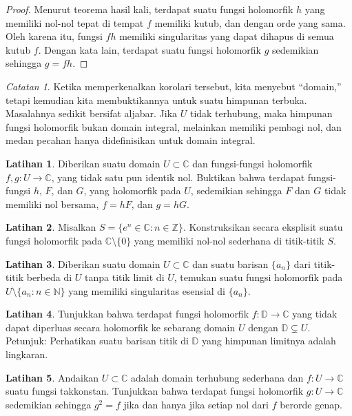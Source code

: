 \documentclass[12pt,openany]{book}
\newcommand{\C}{{\mathbb{C}}}
\newcommand{\Z}{{\mathbb{Z}}}
\newcommand{\N}{{\mathbb{N}}}
\newcommand{\D}{{\mathbb{D}}}
\newcommand{\myquote}[1]{``#1''}
\theoremstyle{plain}
\theoremstyle{remark}
\newtheorem{remark}[thm]{Catatan}
\theoremstyle{definition}
\newenvironment{exbox}{%
    \def\FrameCommand{\vrule width 1pt \relax\hspace{10pt}}%
    \MakeFramed{\advance\hsize-\width\FrameRestore}%
}{%
    \endMakeFramed
}
\theoremstyle{exercise}
\newtheorem{exercise}{Latihan}[section]
\theoremstyle{example}
\begin{document}
\begin{proof}
Menurut teorema hasil kali, terdapat suatu fungsi holomorfik $h$ yang memiliki
nol-nol tepat di tempat $f$ memiliki kutub, dan dengan orde yang sama.  Oleh karena itu, fungsi $fh$
memiliki singularitas yang dapat dihapus di semua kutub $f$.  Dengan kata
lain, terdapat suatu fungsi holomorfik $g$ sedemikian sehingga $g=fh$.
\end{proof}

\begin{remark}
Ketika memperkenalkan korolari tersebut, kita menyebut \myquote{domain,} tetapi kemudian kita membuktikannya
untuk suatu himpunan terbuka.  Masalahnya sedikit bersifat aljabar.  Jika $U$ tidak terhubung,
maka himpunan fungsi holomorfik bukan domain integral, melainkan memiliki pembagi
nol, dan medan pecahan hanya didefinisikan untuk domain integral.
\end{remark}

\begin{exbox}
\begin{exercise}
Diberikan suatu domain $U \subset \C$ dan fungsi-fungsi holomorfik $f,g \colon U \to \C$, yang tidak satu pun
identik nol.  Buktikan bahwa terdapat fungsi-fungsi $h$, $F$,
dan $G$, yang holomorfik pada $U$, sedemikian sehingga $F$ dan $G$ tidak memiliki nol bersama,
$f=hF$, dan $g=hG$.
\end{exercise}

\begin{exercise}
Misalkan $S = \bigl\{ e^n \in \C : n \in \Z \bigr\}$.
Konstruksikan secara eksplisit suatu fungsi holomorfik pada $\C \setminus \{ 0 \}$
yang memiliki nol-nol sederhana di
titik-titik $S$.
\end{exercise}

\begin{exercise}
Diberikan suatu domain $U \subset \C$ dan suatu barisan $\{ a_n \}$ dari titik-titik berbeda di $U$
tanpa titik limit di $U$, temukan suatu fungsi holomorfik pada
$U \setminus \{ a_n : n \in \N \}$ yang memiliki singularitas
esensial di $\{ a_n \}$.
\end{exercise}

\begin{exercise}
Tunjukkan bahwa terdapat fungsi holomorfik $f \colon \D \to \C$ yang
tidak dapat diperluas secara holomorfik ke sebarang domain $U$ dengan $\D \subsetneq U$.  Petunjuk:
Perhatikan suatu barisan titik di $\D$ yang himpunan limitnya adalah lingkaran.
\end{exercise}

\begin{exercise}
Andaikan $U \subset \C$ adalah domain terhubung sederhana dan $f \colon U \to \C$
suatu fungsi takkonstan.  Tunjukkan bahwa terdapat fungsi holomorfik $g \colon U
\to \C$ sedemikian sehingga $g^2 = f$ jika dan hanya jika setiap nol dari $f$ berorde genap.
\end{exercise}
\end{exbox}
\end{document}
